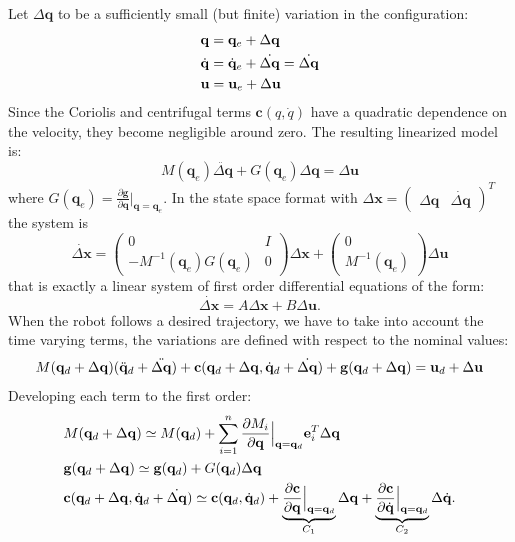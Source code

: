 \documentclass[10pt, a4paper]{report}
\newcommand{\q}{{\mathbf q}}
\begin{document}
Let $\Delta\q$ to be a sufficiently small (but finite) variation in the configuration:\begin{align}
    &\q=\q_e+\Delta\q\\ 
    &\dq=\dq_e+\dot{\Delta \q}=\dot{\Delta \q}\\ 
    &\mathbf u = \mathbf u_e+\Delta \mathbf u
\end{align} 
Since the Coriolis and centrifugal terms $\mathbf c(q, \dot{q})$ have a quadratic dependence on the velocity, they become negligible around zero. The resulting linearized model is:\begin{equation}
    M(\q_e)\ddot{\Delta\q}+G(\q_e)\Delta \q=\Delta \mathbf u 
\end{equation}
where $G(\q_e)=\frac{\partial \mathbf g}{\partial \q}\Big |_{\q=\q_e}$. In the state space format with $\Delta{\mathbf x}=\begin{pmatrix}
    \Delta\q & \dot{\Delta \q }
\end{pmatrix}^T$ the system is\begin{equation}
    \dot{\Delta \mathbf x}=\begin{pmatrix}
        0&I\\ 
        -M^{-1}(\q_e)G(\q_e)&0
    \end{pmatrix}
    \Delta\mathbf x+\begin{pmatrix}
        0\\ 
        M^{-1}(\q_e)
    \end{pmatrix}\Delta{\mathbf u}
\end{equation}
that is exactly a linear system of first order differential equations of the form:\begin{equation}
    \dot{\Delta{\mathbf x}}=A\Delta{\mathbf x}+B\Delta{\mathbf u}.
\end{equation}
When the robot follows a desired trajectory, we have to take into account the time varying terms, the variations are defined with respect to the nominal values:\begin{equation}
    M(\q_d+\Delta \q)(\ddq_d+\ddot{\Delta \q})+\mathbf c(\q_d+\Delta\q, \dq_d+\dot{\Delta\q})+\mathbf g(\q_d+\Delta \q)=\mathbf u_d+\Delta \mathbf u
\end{equation}
Developing each term to the first order:\begin{align}
    &M(\q_d+\Delta\q)\simeq M(\q_d)+\sum_{i=1}^{n}\frac{\partial M_i}{\partial\q}\Big |_{\q=\q_d}\mathbf e_i^T\Delta\q\\ 
    &\mathbf g(\q_d+\Delta \q)\simeq \mathbf g(\q_d)+G(\q_d)\Delta \q\\ 
    &\mathbf c(\q_d+\Delta\q, \dq_d+\dot{\Delta\q})\simeq \mathbf c(\q_d,\dq_d)+\underbrace{\frac{\partial \mathbf c}{\partial \q}\Big |_{\q=\q_d}}_{C_1}\Delta \q+\underbrace{\frac{\partial \mathbf c}{\partial \dq}\Big |_{\q=\q_d}}_{C_2}\Delta \dq.
\end{align}
\end{document}

